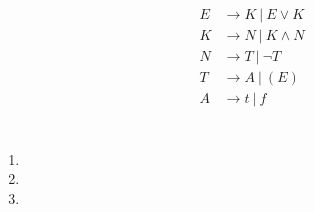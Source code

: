 \documentclass[a4paper,10pt]{scrartcl}
\begin{document}
\section{}
\begin{align*}
    E &\to K\ |\ E \lor K \\
    K &\to N\ |\ K \land N \\
    N &\to T\ |\ \neg T\\
    T &\to A\ |\ (E)\\
    A &\to t\ |\ f
\end{align*}

\section{}
\begin{enumerate}
 \item	
 \item	
 \item	
\end{enumerate}
\end{document}

